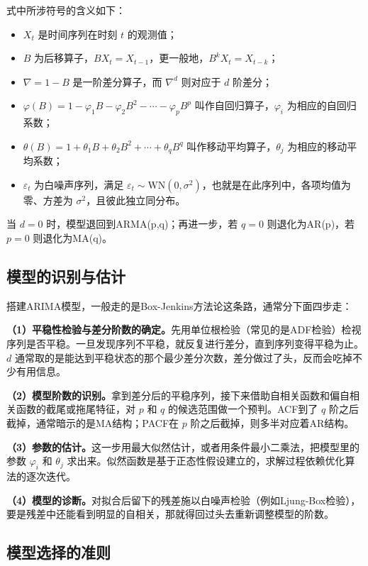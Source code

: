 \documentclass[12pt,a4paper,oneside]{ctexbook}
\begin{document}
	式中所涉符号的含义如下：
	\begin{itemize}
		\item $X_t$ 是时间序列在时刻 $t$ 的观测值；
		\item $B$ 为后移算子，$B X_t = X_{t-1}$，更一般地，$B^k X_t = X_{t-k}$；
		\item $\nabla = 1 - B$ 是一阶差分算子，而 $\nabla^d$ 则对应于 $d$ 阶差分；
		\item $\varphi(B) = 1 - \varphi_1 B - \varphi_2 B^2 - \cdots - \varphi_p B^p$ 叫作自回归算子，$\varphi_i$ 为相应的自回归系数；
		\item $\theta(B) = 1 + \theta_1 B + \theta_2 B^2 + \cdots + \theta_q B^q$ 叫作移动平均算子，$\theta_j$ 为相应的移动平均系数；
		\item $\varepsilon_t$ 为白噪声序列，满足 $\varepsilon_t \sim \text{WN}(0, \sigma^2)$，也就是在此序列中，各项均值为零、方差为 $\sigma^2$，且彼此独立同分布。
	\end{itemize}
	
	当 $d=0$ 时，模型退回到ARMA(p,q)；再进一步，若 $q=0$ 则退化为AR(p)，若 $p=0$ 则退化为MA(q)。
	
	\subsection{模型的识别与估计}
	
	搭建ARIMA模型，一般走的是Box-Jenkins方法论这条路，通常分下面四步走：
	
	\textbf{（1）平稳性检验与差分阶数的确定。}先用单位根检验（常见的是ADF检验）检视序列是否平稳。一旦发现序列不平稳，就反复进行差分，直到序列变得平稳为止。$d$ 通常取的是能达到平稳状态的那个最少差分次数，差分做过了头，反而会吃掉不少有用信息。
	
	\textbf{（2）模型阶数的识别。}拿到差分后的平稳序列，接下来借助自相关函数和偏自相关函数的截尾或拖尾特征，对 $p$ 和 $q$ 的候选范围做一个预判。ACF到了 $q$ 阶之后截掉，通常暗示的是MA结构；PACF在 $p$ 阶之后截掉，则多半对应着AR结构。
	
	\textbf{（3）参数的估计。}这一步用最大似然估计，或者用条件最小二乘法，把模型里的参数 $\varphi_i$ 和 $\theta_j$ 求出来。似然函数是基于正态性假设建立的，求解过程依赖优化算法的逐次迭代。
	
	\textbf{（4）模型的诊断。}对拟合后留下的残差施以白噪声检验（例如Ljung-Box检验），要是残差中还能看到明显的自相关，那就得回过头去重新调整模型的阶数。
	
	\subsection{模型选择的准则}
	
\end{document}
